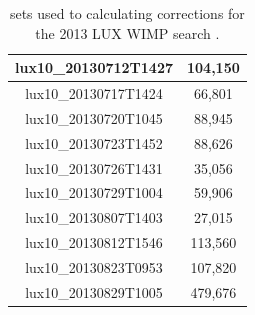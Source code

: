 \begin{table}[h!]
\begin{center}
\begin{tabular}{|c|c|}
lux10\_20130712T1427	&	104,150	\\ \hline
lux10\_20130717T1424	&	66,801	\\ \hline
lux10\_20130720T1045	&	88,945	\\ \hline
lux10\_20130723T1452	&	88,626	\\ \hline
lux10\_20130726T1431	&	35,056	\\ \hline
lux10\_20130729T1004	&	59,906	\\ \hline
lux10\_20130807T1403	&	27,015	\\ \hline
lux10\_20130812T1546	&	113,560	\\ \hline
lux10\_20130823T0953	&	107,820	\\ \hline
lux10\_20130829T1005	&	479,676	\\ \hline
\end{tabular}
\caption{\KrCal sets used to calculating corrections for the 2013 LUX WIMP search \cite{LUX_PRL}.}
\label{table:Kr_Cal_Sets}
\end{center}
\end{table}
\renewcommand{\baselinestretch}{2}
\small\normalsize





